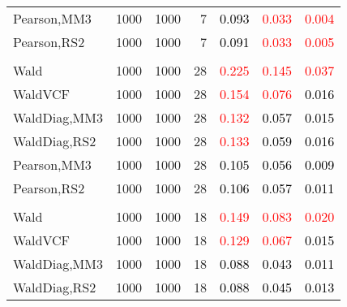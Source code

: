 \documentclass[
]{article}
\begin{document}
\begin{table}[H]
{\begin{tabular}[t]{lrrrrrr}
\hspace{1em}Pearson,MM3 & 1000 & 1000 & 7 & \textcolor{black}{0.093} & \textcolor{red}{0.033} & \textcolor{red}{0.004}\\
\hspace{1em}Pearson,RS2 & 1000 & 1000 & 7 & \textcolor{black}{0.091} & \textcolor{red}{0.033} & \textcolor{red}{0.005}\\
\addlinespace[0.3em]
\multicolumn{7}{l}{\textbf{1F 15V}}\\
\hspace{1em}Wald & 1000 & 1000 & 28 & \textcolor{red}{0.225} & \textcolor{red}{0.145} & \textcolor{red}{0.037}\\
\hspace{1em}WaldVCF & 1000 & 1000 & 28 & \textcolor{red}{0.154} & \textcolor{red}{0.076} & \textcolor{black}{0.016}\\
\hspace{1em}WaldDiag,MM3 & 1000 & 1000 & 28 & \textcolor{red}{0.132} & \textcolor{black}{0.057} & \textcolor{black}{0.015}\\
\hspace{1em}WaldDiag,RS2 & 1000 & 1000 & 28 & \textcolor{red}{0.133} & \textcolor{black}{0.059} & \textcolor{black}{0.016}\\
\hspace{1em}Pearson,MM3 & 1000 & 1000 & 28 & \textcolor{black}{0.105} & \textcolor{black}{0.056} & \textcolor{black}{0.009}\\
\hspace{1em}Pearson,RS2 & 1000 & 1000 & 28 & \textcolor{black}{0.106} & \textcolor{black}{0.057} & \textcolor{black}{0.011}\\
\addlinespace[0.3em]
\multicolumn{7}{l}{\textbf{2F 10V}}\\
\hspace{1em}Wald & 1000 & 1000 & 18 & \textcolor{red}{0.149} & \textcolor{red}{0.083} & \textcolor{red}{0.020}\\
\hspace{1em}WaldVCF & 1000 & 1000 & 18 & \textcolor{red}{0.129} & \textcolor{red}{0.067} & \textcolor{black}{0.015}\\
\hspace{1em}WaldDiag,MM3 & 1000 & 1000 & 18 & \textcolor{black}{0.088} & \textcolor{black}{0.043} & \textcolor{black}{0.011}\\
\hspace{1em}WaldDiag,RS2 & 1000 & 1000 & 18 & \textcolor{black}{0.088} & \textcolor{black}{0.045} & \textcolor{black}{0.013}\\

\end{tabular}}
\end{table}
\end{document}
